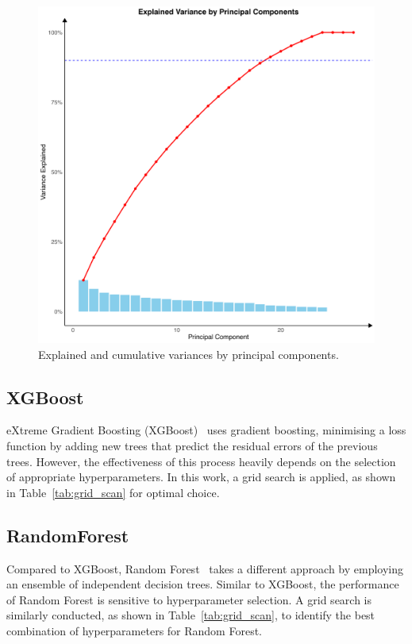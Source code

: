 \documentclass[9pt,twocolumn,twoside]{pnas-new}
\begin{document}
\begin{figure}[!tbhp]
\centering
\includegraphics[width=0.8\linewidth]
{regression/pca_regression_lm.png}
\caption{Explained and cumulative variances by principal components.}
\label{fig:lmpca}
\end{figure}


\subsection*{XGBoost}
eXtreme Gradient Boosting (XGBoost)~\cite{10.1145/2939672.2939785} uses gradient boosting, minimising a loss function by adding new trees that predict the residual errors of the previous trees. However, the effectiveness of this process heavily depends on the selection of appropriate hyperparameters. In this work, a grid search is applied, as shown in Table~\ref{tab:grid_scan} for optimal choice.



\subsection*{RandomForest}

Compared to XGBoost, Random Forest~\cite{Breiman2001} takes a different approach by employing an ensemble of independent decision trees.  Similar to XGBoost, the performance of Random Forest is sensitive to hyperparameter selection. A grid search is similarly conducted, as shown in Table~\ref{tab:grid_scan}, to identify the best combination of hyperparameters for Random Forest.
\end{document}

